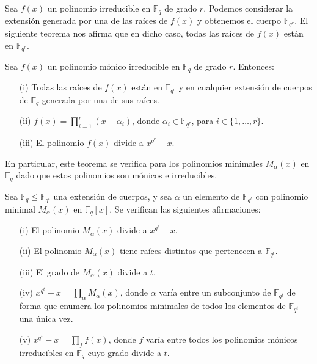 Sea $f(x)$ un polinomio irreducible en $\mathbb{F}_q$ de grado $r$. Podemos considerar la extensión generada por una de las raíces de $f(x)$ y obtenemos el cuerpo $\mathbb{F}_{q^r}$. El siguiente teorema nos afirma que en dicho caso, todas las raíces de $f(x)$ están en $\mathbb{F}_{q^r}$.

\begin{teorema}
Sea $f(x)$ un polinomio mónico irreducible en $\mathbb{F}_{q}$ de grado $r$. Entonces:
\begin{itemize}
    \item[(i)] Todas las raíces de $f(x)$ están en $\mathbb{F}_{q^r}$ y en cualquier extensión de cuerpos de $\mathbb{F}_{q}$ generada por una de sus raíces.
    \item[(ii)] $f(x) = \prod_{i=1}^{r}(x-\alpha_i)$, donde $\alpha_i \in \mathbb{F}_{q^r}$, para $i \in \{1,\dots,r\}$.
    \item[(iii)] El polinomio $f(x)$ divide a $x^{q^r} - x$.
\end{itemize}
\end{teorema}

En particular, este teorema se verifica para los polinomios minimales $M_{\alpha}(x)$ en $\mathbb{F}_q$ dado que estos polinomios son mónicos e irreducibles.

\begin{teorema}\label{th:1.pm}
    Sea \( \mathbb{F}_q  \leq \mathbb{F}_{q^t} \) una extensión de cuerpos, y sea \( \alpha \) un elemento de \( \mathbb{F}_{q^t} \) con polinomio minimal \( M_{\alpha}(x) \) en \( \mathbb{F}_q[x] \). Se verifican las siguientes afirmaciones:
    \begin{itemize}
      \item[(i)] El polinomio \( M_{\alpha}(x) \) divide a \( x^{q^t} - x \).
      \item[(ii)] El polinomio \( M_{\alpha}(x) \) tiene raíces distintas que pertenecen a \( \mathbb{F}_{q^t} \).
      \item[(iii)] El grado de \( M_{\alpha}(x) \) divide a \( t \).
      \item[(iv)] $ x^{q^t} - x = \prod_{\alpha}M_\alpha(x)$, donde $\alpha$ varía entre un subconjunto de $\mathbb{F}_{q^t}$ de forma que enumera los polinomios minimales de todos los elementos de $\mathbb{F}_{q^t}$ una única vez.
      \item[(v)] $ x^{q^t} - x = \prod_{f}f(x)$, donde $f$ varía entre todos los polinomios mónicos irreducibles en $\mathbb{F}_q$ cuyo grado divide a $t$.
    \end{itemize}
    \end{teorema}

